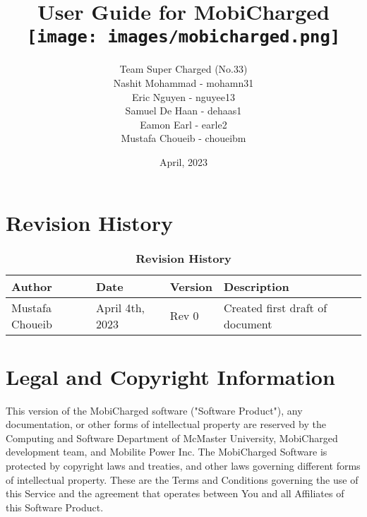 \documentclass[12pt, titlepage]{article}
\begin{document}
\title{
    User Guide for MobiCharged\\
    \texttt{[image: images/mobicharged.png]} 
}
\author{Team Super Charged (No.33)
		\\ Nashit Mohammad - mohamn31
		\\ Eric Nguyen - nguyee13
		\\ Samuel De Haan - dehaas1
		\\ Eamon Earl - earle2
		\\ Mustafa Choueib - choueibm
}
    

\date{April, 2023}


\maketitle

\tableofcontents
\listoffigures
\listoftables

\vspace{20pt}


\newpage


\section{Revision History}
\begin{center}
\begin{table}[H]
\caption{\bf Revision History}
    \begin{tabular}{p{2cm}p{3cm}p{2cm}p{6cm}}
    \hline
    \bf Author & \bf Date & \bf Version & \bf Description\\
    \hline
    Mustafa Choueib & April 4th, 2023 & Rev 0 & Created first draft of document\\
    \hline
    \end{tabular}
\end{table}
\end{center}


\section{Legal and Copyright Information}
This version of the MobiCharged software ("Software Product"), any documentation, or other forms of intellectual property are reserved by the Computing and Software Department of McMaster University, MobiCharged development team, and Mobilite Power Inc. The MobiCharged Software is protected by copyright laws and treaties, and other laws governing different forms of intellectual property. These are the Terms and Conditions governing the use of this Service and the agreement that operates between You and all Affiliates of this Software Product.
\end{document}
